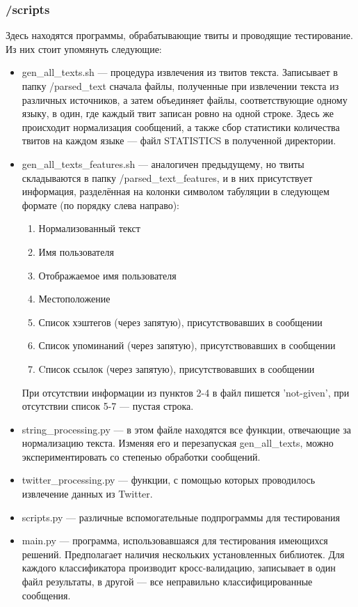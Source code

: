 \documentclass[a4paper, 14pt]{article}
\begin{document}
			\subsubsection{/scripts}
			Здесь находятся программы, обрабатывающие твиты и проводящие тестирование. Из них стоит упомянуть следующие:
			\begin{itemize}
				\item gen_all_texts.sh --- процедура извлечения из твитов текста. Записывает в папку /parsed\_text сначала файлы, полученные при извлечении текста из различных источников, а затем объединяет файлы, соответствующие одному языку, в один, где каждый твит записан ровно на одной строке. Здесь же происходит нормализация сообщений, а также сбор статистики количества твитов на каждом языке --- файл STATISTICS в полученной директории.
				\item gen_all_texts_features.sh --- аналогичен предыдущему, но твиты складываются в папку /parsed\_text\_features, и в них присутствует информация, разделённая на колонки символом табуляции в следующем формате (по порядку слева направо):
				\begin{enumerate}
					\item Нормализованный текст
					\item Имя пользователя
					\item Отображаемое имя пользователя
					\item Местоположение
					\item Список хэштегов (через запятую), присутствовавших в сообщении
					\item Список упоминаний (через запятую), присутствовавших в сообщении
					\item Cписок ссылок (через запятую), присутствовавших в сообщении
				\end{enumerate}
				При отсутствии информации из пунктов 2-4 в файл пишется 'not-given', при отсутствии список 5-7 --- пустая строка.
				\item string_processing.py --- в этом файле находятся все функции, отвечающие за нормализацию текста. Изменяя его и перезапуская gen_all_texts, можно экспериментировать со степенью обработки сообщений.
				\item twitter_processing.py --- функции, с помощью которых проводилось извлечение данных из Twitter.
				\item scripts.py --- различные вспомогательные подпрограммы для тестирования
				\item main.py --- программа, использовавшаяся для тестирования имеющихся решений. Предполагает наличия нескольких установленных библиотек. Для каждого классификатора производит кросс-валидацию, записывает в один файл результаты, в другой --- все неправильно классифицированные сообщения.
			\end{itemize}
\end{document}
